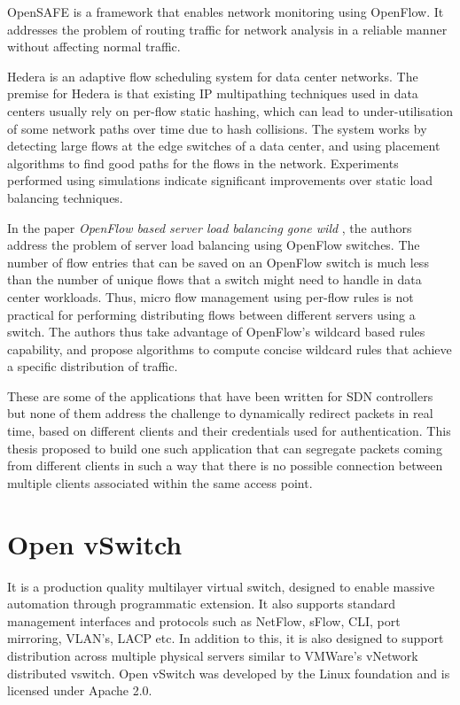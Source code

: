 OpenSAFE \cite{ballard2010extensible} is a framework that enables network monitoring using OpenFlow. It addresses the problem of routing traffic for network analysis in a reliable manner without affecting normal traffic. 

Hedera \cite{al2010hedera} is an adaptive flow scheduling system for data center networks. The premise for Hedera is that existing IP multipathing techniques used in data centers usually rely on per-flow static hashing, which can lead to under-utilisation of some network paths over time due to hash collisions. The system works by detecting large flows at the edge switches of a data center, and using placement algorithms to find good paths for the flows in the network. Experiments performed using simulations indicate significant improvements over static load balancing techniques. 

In the paper \textit{OpenFlow based server load balancing gone wild} \cite{wang2011openflow}, the authors address the problem of server load balancing using OpenFlow switches. The number of flow entries that can be saved on an OpenFlow switch is much less than the number of unique flows that a switch might need to handle in data center workloads. Thus, micro flow management using per-flow rules is not practical for performing distributing flows between different servers using a switch. The authors thus take advantage of OpenFlow’s wildcard based rules capability, and propose algorithms to compute concise wildcard rules that achieve a specific distribution of traffic.

These are some of the applications that have been written for SDN controllers but none of them address the challenge to dynamically redirect packets in real time, based on different clients and their credentials used for authentication. This thesis proposed to build one such application that can segregate packets coming from different clients in such a way that there is no possible connection between multiple clients associated within the same access point.

\section{Open vSwitch \cite{OpenVswitch_design}} \label{OpenvSwitch}
It is a production quality multilayer virtual switch, designed to enable massive automation through programmatic extension. It also supports standard management interfaces and protocols such as NetFlow, sFlow, CLI, port mirroring, VLAN’s, LACP etc. In addition to this, it is also designed to support distribution across multiple physical servers similar to VMWare’s vNetwork distributed vswitch. Open vSwitch was developed by the Linux foundation and is licensed under Apache 2.0.

